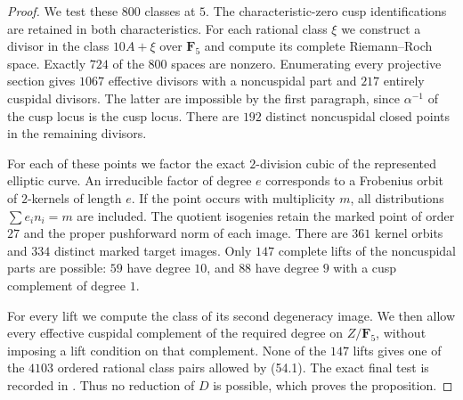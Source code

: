 \begin{proof}
We test these $800$ classes at $5$. The characteristic-zero cusp
identifications are retained in both characteristics. For each rational
class $\xi$ we construct a divisor in the class $10A+\xi$ over
$\mathbf F_5$ and compute its complete Riemann--Roch space. Exactly
$724$ of the $800$ spaces are nonzero. Enumerating every projective
section gives $1067$ effective divisors with a noncuspidal part and
$217$ entirely cuspidal divisors. The latter are impossible by the
first paragraph, since $\alpha^{-1}$ of the cusp locus is the cusp
locus. There are $192$ distinct noncuspidal closed points in the
remaining divisors.

For each of these points we factor the exact $2$-division cubic of
the represented elliptic curve. An irreducible factor of degree $e$
corresponds to a Frobenius orbit of $2$-kernels of length $e$.
If the point occurs with multiplicity $m$, all distributions
$\sum e_i n_i=m$ are included. The quotient isogenies retain the
marked point of order $27$ and the proper pushforward norm of each
image. There are $361$ kernel orbits and $334$ distinct marked target
images. Only $147$ complete lifts of the noncuspidal parts are possible:
$59$ have degree $10$, and $88$ have degree $9$ with a cusp complement
of degree $1$.

For every lift we compute the class of its second degeneracy image.
We then allow every effective cuspidal complement of the required
degree on $Z/\mathbf F_5$, without imposing a lift condition on that
complement. None of the $147$ lifts gives one of the $4103$ ordered
rational class pairs allowed by (54.1). The exact final test is recorded
in . Thus no reduction of $D$ is possible,
which proves the proposition.
\end{proof}
